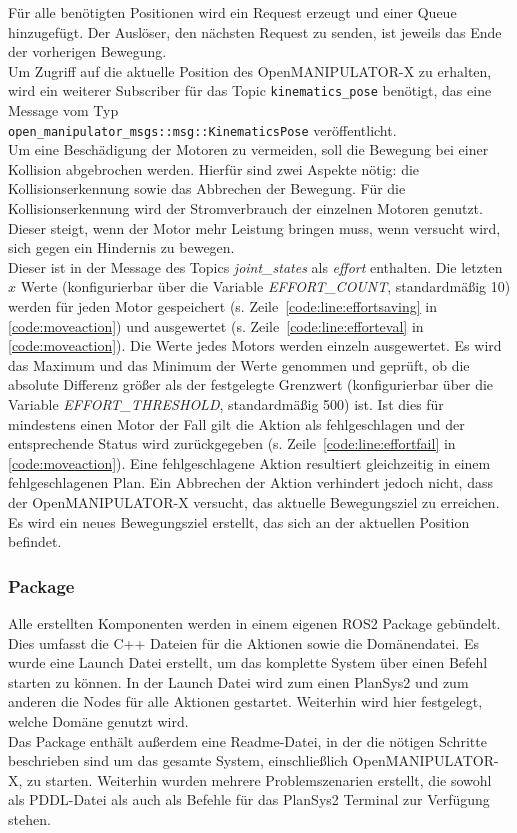 Für alle benötigten Positionen wird ein Request erzeugt und einer Queue hinzugefügt.
Der Auslöser, den nächsten Request zu senden, ist jeweils das Ende der vorherigen Bewegung.\\
Um Zugriff auf die aktuelle Position des OpenMANIPULATOR-X zu erhalten, wird ein weiterer Subscriber für das Topic \verb|kinematics_pose| benötigt, das eine Message vom Typ\\
\verb|open_manipulator_msgs::msg::KinematicsPose| veröffentlicht.\\
Um eine Beschädigung der Motoren zu vermeiden, soll die Bewegung bei einer Kollision abgebrochen werden.
Hierfür sind zwei Aspekte nötig: die Kollisionserkennung sowie das Abbrechen der Bewegung.
Für die Kollisionserkennung wird der Stromverbrauch der einzelnen Motoren genutzt.
Dieser steigt, wenn der Motor mehr Leistung bringen muss, wenn versucht wird, sich gegen ein Hindernis zu bewegen.\\
Dieser ist in der Message des Topics \emph{joint\_states} als \emph{effort} enthalten.
Die letzten $x$ Werte (konfigurierbar über die Variable \emph{EFFORT\_COUNT}, standardmäßig 10) werden für jeden Motor gespeichert (s. Zeile~\ref{code:line:effortsaving} in \ref{code:moveaction}) und ausgewertet (s. Zeile~\ref{code:line:efforteval} in \ref{code:moveaction}).
Die Werte jedes Motors werden einzeln ausgewertet.
Es wird das Maximum und das Minimum der Werte genommen und geprüft, ob die absolute Differenz größer als der festgelegte Grenzwert (konfigurierbar über die Variable \emph{EFFORT\_THRESHOLD}, standardmäßig 500) ist.
Ist dies für mindestens einen Motor der Fall gilt die Aktion als fehlgeschlagen und der entsprechende Status wird zurückgegeben (s. Zeile~\ref{code:line:effortfail} in \ref{code:moveaction}).
Eine fehlgeschlagene Aktion resultiert gleichzeitig in einem fehlgeschlagenen Plan.
Ein Abbrechen der Aktion verhindert jedoch nicht, dass der OpenMANIPULATOR-X versucht, das aktuelle Bewegungsziel zu erreichen.
Es wird ein neues Bewegungsziel erstellt, das sich an der aktuellen Position befindet.


\subsubsection{Package}
Alle erstellten Komponenten werden in einem eigenen \ac{ROS2} Package gebündelt.
Dies umfasst die C++ Dateien für die Aktionen sowie die Domänendatei.
Es wurde eine Launch Datei erstellt, um das komplette System über einen Befehl starten zu können.
In der Launch Datei wird zum einen \ac{PlanSys2} und zum anderen die Nodes für alle Aktionen gestartet.
Weiterhin wird hier festgelegt, welche Domäne genutzt wird.\\
Das Package enthält außerdem eine Readme-Datei, in der die nötigen Schritte beschrieben sind um das gesamte System, einschließlich OpenMANIPULATOR-X, zu starten.
Weiterhin wurden mehrere Problemszenarien erstellt, die sowohl als \ac{PDDL}-Datei als auch als Befehle für das \ac{PlanSys2} Terminal zur Verfügung stehen.

